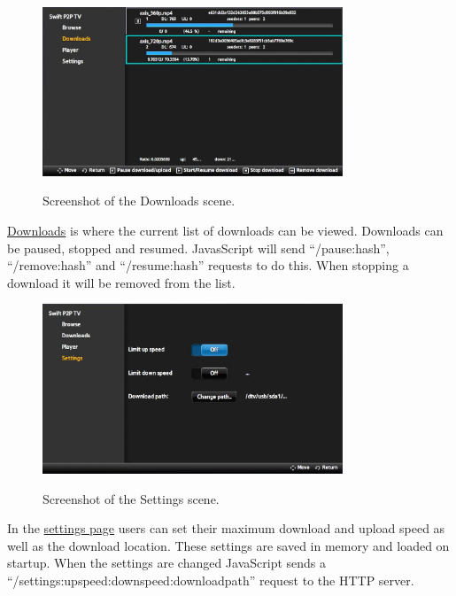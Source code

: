 \begin{center}
\begin{figure}[h]
	\centering
	\mbox{\includegraphics[width=0.8\textwidth]{Images/DownloadsScene.jpg}}
	\label{fig:downloads}
	\caption{Screenshot of the Downloads scene.}
\end{figure}
\end{center}

\hyperref[fig:downloads]{Downloads} is where the current list of downloads can be viewed. Downloads can be paused, stopped and resumed. JavasScript will send ``/pause:hash'', ``/remove:hash'' and ``/resume:hash'' requests to do this.
When stopping a download it will be removed from the list.

\begin{center}
\begin{figure}[h]
	\centering
	\mbox{\includegraphics[width=0.8\textwidth]{Images/SettingsScene.jpg}}
	\label{fig:settings}
	\caption{Screenshot of the Settings scene.}
\end{figure}
\end{center}

In the \hyperref[fig:settings]{settings page} users can set their maximum download and upload speed as well as the download location. These settings are saved in memory and loaded on startup. When the settings are changed JavaScript sends a ``/settings:upspeed:downspeed:downloadpath'' request to the HTTP server.


